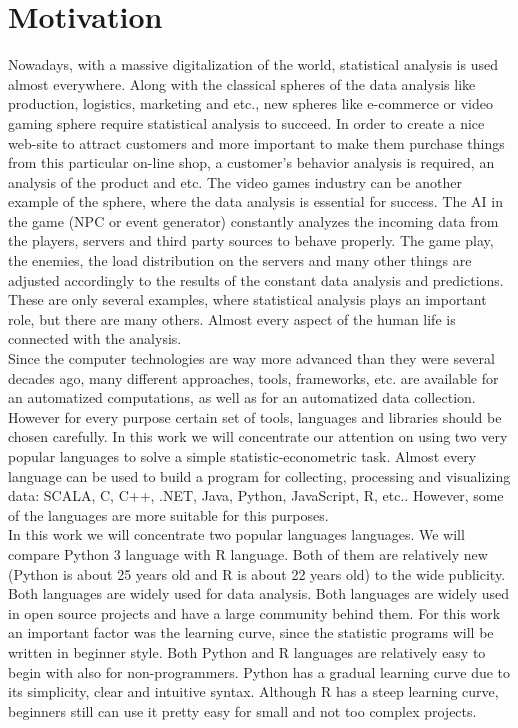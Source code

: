 \documentclass{article}
\begin{document}
\newpage
\section{Motivation}
Nowadays, with a massive digitalization of the world, statistical analysis is used almost everywhere. Along with the classical spheres of the data analysis like production, logistics, marketing and etc., new spheres like e-commerce or video gaming sphere require statistical analysis to succeed. In order to create a nice web-site to attract customers and more important to make them purchase things from this particular on-line shop, a customer's behavior analysis is required, an analysis of the product and etc. The video games industry can be another example of the sphere, where the data analysis is essential for success. The AI in the game (NPC or event generator) constantly analyzes the incoming data from the players, servers and third party sources to behave properly. The game play, the enemies, the load distribution on the servers and many other things are adjusted accordingly to the results of the constant data analysis and predictions. These are only several examples, where statistical analysis plays an important role, but there are many others. Almost every aspect of the human life is connected with the analysis.\vspace{3mm}\\
Since the computer technologies are way more advanced than they were several decades ago, many different approaches, tools, frameworks, etc. are available for an automatized computations, as well as for an automatized data collection. However for every purpose certain set of tools, languages and libraries should be chosen carefully. In this work we will concentrate our attention on using two very popular languages to solve a simple statistic-econometric task. Almost every language can be used to build a program for collecting, processing and visualizing data: SCALA, C, C++, .NET, Java, Python, JavaScript, R, etc.. However, some of the languages are more suitable for this purposes.\vspace{3mm}\\
In this work we will concentrate two popular languages languages. We will compare Python 3 language with R language. Both of them are relatively new (Python is about 25 years old and R is about 22 years old) to the wide publicity. Both languages are widely used for data analysis. Both languages are widely used in open source projects and have a large community behind them. For this work an important factor was the learning curve, since the statistic programs will be written in beginner style. Both Python and R  languages are relatively easy to begin with also for non-programmers. Python has a gradual learning curve due to its simplicity, clear and intuitive syntax. Although R has a steep learning curve, beginners still can use it pretty easy for small and not too complex projects.
\end{document}
